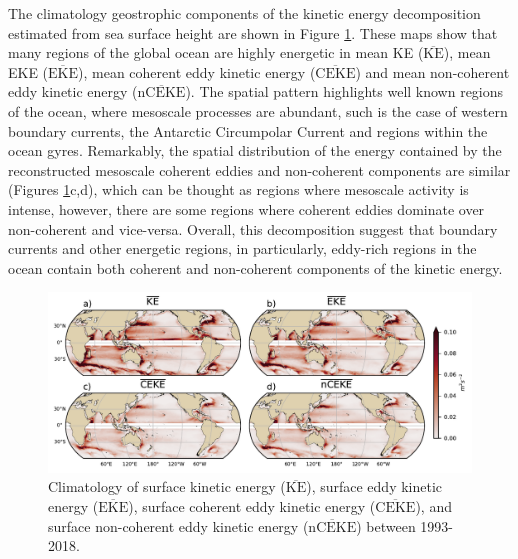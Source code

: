 \documentclass[draft,linenumbers]{agujournal2019}
\newcommand{\MKE}{\overline{\textrm{KE}}}
\newcommand{\MEKE}{\overline{\textrm{EKE}}}
\newcommand{\MCEKE}{\overline{\textrm{CEKE}}}
\newcommand{\MnCEKE}{\overline{\textrm{nCEKE}}}
\begin{document}
	The climatology geostrophic components of the kinetic energy decomposition estimated from sea surface height are shown in Figure \ref{fig:eddy_climatology}. These maps show that many regions of the global ocean are highly energetic in mean KE ($\MKE$), mean EKE ($\MEKE$), mean coherent eddy kinetic energy ($\MCEKE$) and mean non-coherent eddy kinetic energy ($\MnCEKE$). The spatial pattern highlights well known regions of the ocean, where mesoscale processes are abundant, such is the case of western boundary currents, the Antarctic Circumpolar Current and regions within the ocean gyres. Remarkably, the spatial distribution of the energy contained by the reconstructed mesoscale coherent eddies and non-coherent components are similar (Figures \ref{fig:eddy_climatology}c,d), which can be thought as regions where mesoscale activity is intense, however, there are some regions where coherent eddies dominate over non-coherent and vice-versa. Overall, this decomposition suggest that boundary currents and other energetic regions, in particularly, eddy-rich regions in the ocean contain both coherent and non-coherent components of the kinetic energy.

	\begin{figure}
	    \centering
	    \includegraphics[width=1\textwidth]{figures/mean_ke_maps_satellite.pdf}
	    \caption{Climatology of surface kinetic energy ($\MKE$), surface eddy kinetic energy ($\MEKE$), surface coherent eddy kinetic energy ($\MCEKE$), and surface non-coherent eddy kinetic energy ($\MnCEKE$) between 1993-2018.}
	    \label{fig:eddy_climatology}
	\end{figure}
\end{document}
